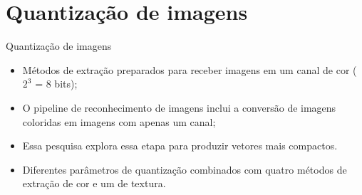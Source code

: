 \documentclass{beamer}
\begin{document}
\section{Quantização de imagens}
\begin{frame}{Quantização de imagens}
  \setlength\leftmargini{1em}
  \begin{block}{}
    \justifying
    \begin{itemize}
      \item Métodos de extração preparados para receber imagens em um canal de cor ($2^3$ = 8 bits);
      \item O pipeline de reconhecimento de imagens inclui a conversão de imagens coloridas em imagens com apenas um canal;
      \item Essa pesquisa explora essa etapa para produzir vetores mais compactos.
      \item Diferentes parâmetros de quantização combinados com quatro métodos de extração de cor e um de textura.
    \end{itemize}
  \end{block}
\end{frame}
\end{document}
